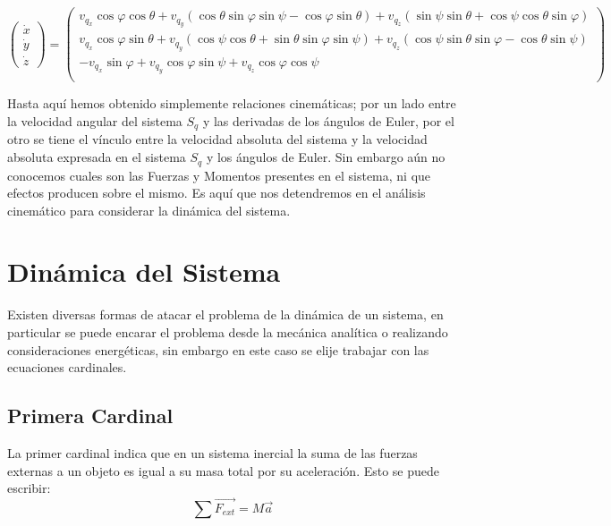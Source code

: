 \documentclass[main]{subfiles}
\begin{document}
\begin{footnotesize}

\begin{equation}
\left( \begin{array}{c}
\dot{x}\\
\dot{y}\\
\dot{z}
\end{array}  \right) = \left( \begin{array}{c}
v_{q_x} \cos \varphi \cos \theta + v_{q_y} ( \cos \theta \sin \varphi \sin \psi-\cos \varphi \sin \theta ) + v_{q_z}(\sin \psi \sin \theta + \cos \psi \cos \theta \sin \varphi)  \\
v_{q_x} \cos \varphi \sin \theta + v_{q_y} (\cos \psi \cos \theta + \sin \theta \sin \varphi \sin \psi) + v_{q_z}( \cos \psi \sin \theta \sin \varphi-\cos \theta \sin \psi ) \\
-v_{q_x} \sin \varphi  + v_{q_y} \cos \varphi \sin \psi  + v_{q_z}\cos \varphi \cos \psi \\
\end{array} \right)
\label{eq:pospunto}
\end{equation}
\end{footnotesize} 

Hasta aqu\'i hemos obtenido simplemente relaciones cinem\'aticas; por un lado entre la velocidad angular del sistema $S_q$ y las derivadas de los \'angulos de Euler, por el otro se tiene el v\'inculo entre la velocidad absoluta del sistema y la velocidad absoluta expresada en el sistema $S_q$ y los \'angulos de Euler. Sin embargo a\'un no conocemos cuales son las Fuerzas y Momentos presentes en el sistema, ni que efectos producen sobre el mismo. Es aqu\'i que nos detendremos en el an\'alisis cinem\'atico para considerar la din\'amica del sistema. 

\section{Din\'amica del Sistema}
Existen diversas formas de atacar el problema de la din\'amica de un sistema, en particular se puede encarar el problema desde la mec\'anica anal\'itica o realizando consideraciones energ\'eticas, sin embargo en este caso se elije trabajar con las ecuaciones cardinales. 
\subsection{Primera Cardinal}
 
La primer cardinal indica que en un sistema inercial la suma de las fuerzas externas a un objeto es igual a su masa total por su aceleraci\'on. Esto se puede escribir:
$$\sum \vec{F_{ext}} = M\vec{a}$$
\end{document}
